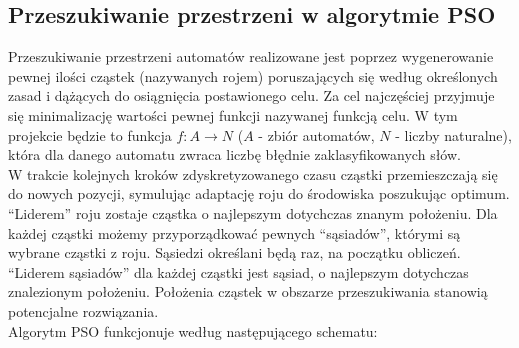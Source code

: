 \documentclass{llncs}
\begin{document}
\subsection{Przeszukiwanie przestrzeni w algorytmie PSO}

Przeszukiwanie przestrzeni automatów realizowane jest poprzez wygenerowanie pewnej ilości cząstek (nazywanych rojem) poruszających się według określonych zasad i dążących do osiągnięcia postawionego celu. Za cel najczęściej przyjmuje się minimalizację wartości pewnej funkcji nazywanej funkcją celu. W tym projekcie będzie to funkcja $f:A \rightarrow N$ ($A$ - zbiór automatów, $N$ - liczby naturalne), która dla danego automatu zwraca liczbę błędnie zaklasyfikowanych słów.\\

W trakcie kolejnych kroków zdyskretyzowanego czasu cząstki przemieszczają się do nowych pozycji, symulując adaptację roju do środowiska poszukując optimum. “Liderem” roju zostaje cząstka o najlepszym dotychczas znanym położeniu. Dla każdej cząstki możemy przyporządkować pewnych “sąsiadów”, którymi są wybrane cząstki z roju. Sąsiedzi określani będą raz, na początku obliczeń. “Liderem sąsiadów” dla każdej cząstki jest sąsiad, o najlepszym dotychczas znalezionym położeniu. Położenia cząstek w obszarze przeszukiwania stanowią potencjalne rozwiązania.\\

Algorytm PSO funkcjonuje według następującego schematu:
\end{document}
